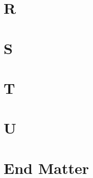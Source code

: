 \documentclass[openany]{book}
\begin{document}
\chapter{R}



%




\chapter{S}










\chapter{T}


%

\chapter{U}


\chapter{End Matter}








\end{document}
